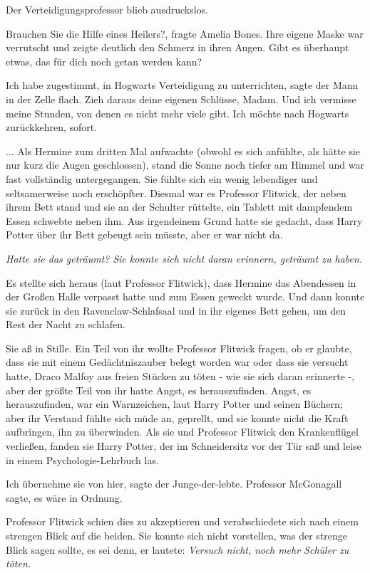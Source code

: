 Der Verteidigungsprofessor blieb ausdruckslos.

\glqq{}Brauchen Sie die Hilfe eines Heilers?\grqq{}, fragte Amelia Bones. Ihre
eigene Maske war verrutscht und zeigte deutlich den Schmerz in ihren Augen.
\glqq{}Gibt es überhaupt etwas, das für dich noch getan werden kann?\grqq{}

\glqq{}Ich habe zugestimmt, in Hogwarts Verteidigung zu unterrichten\grqq{},
sagte der Mann in der Zelle flach. \glqq{}Zieh daraus deine eigenen Schlüsse,
Madam. Und ich vermisse meine Stunden, von denen es nicht mehr viele gibt. Ich
möchte nach Hogwarts zurückkehren, sofort.\grqq{}

... Als Hermine zum dritten Mal aufwachte (obwohl es sich anfühlte, als hätte
sie nur kurz die Augen geschlossen), stand die Sonne noch tiefer am Himmel und
war fast vollständig untergegangen. Sie fühlte sich ein wenig lebendiger und
seltsamerweise noch erschöpfter. Diesmal war es Professor Flitwick, der neben
ihrem Bett stand und sie an der Schulter rüttelte, ein Tablett mit dampfendem
Essen schwebte neben ihm. Aus irgendeinem Grund hatte sie gedacht, dass Harry
Potter über ihr Bett gebeugt sein müsste, aber er war nicht da.

\emph{Hatte sie das geträumt?} \emph{Sie konnte sich nicht daran erinnern,
geträumt zu haben.}

Es stellte sich heraus (laut Professor Flitwick), dass Hermine das Abendessen in
der Großen Halle verpasst hatte und zum Essen geweckt wurde. Und dann konnte sie
zurück in den Ravenclaw-Schlafsaal und in ihr eigenes Bett gehen, um den Rest
der Nacht zu schlafen.

Sie aß in Stille. Ein Teil von ihr wollte Professor Flitwick fragen, ob er
glaubte, dass sie mit einem Gedächtniszauber belegt worden war oder dass sie
versucht hatte, Draco Malfoy aus freien Stücken zu töten - wie sie sich daran
erinnerte -, aber der größte Teil von ihr hatte Angst, es herauszufinden. Angst,
es herauszufinden, war ein Warnzeichen, laut Harry Potter und seinen Büchern;
aber ihr Verstand fühlte sich müde an, geprellt, und sie konnte nicht die Kraft
aufbringen, ihn zu überwinden. Als sie und Professor Flitwick den Krankenflügel
verließen, fanden sie Harry Potter, der im Schneidersitz vor der Tür saß und
leise in einem Psychologie-Lehrbuch las.

\glqq{}Ich übernehme sie von hier\grqq{}, sagte der Junge-der-lebte. \glqq{}
Professor McGonagall sagte, es wäre in Ordnung.\grqq{}

Professor Flitwick schien dies zu akzeptieren und verabschiedete sich nach einem
strengen Blick auf die beiden. Sie konnte sich nicht vorstellen, was der strenge
Blick sagen sollte, es sei denn, er lautete: \emph{Versuch nicht, noch mehr
Schüler zu töten.}

